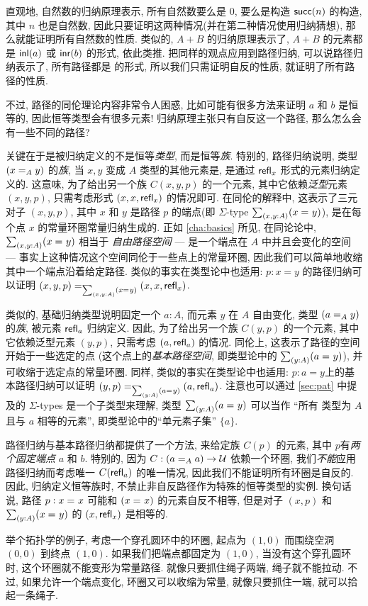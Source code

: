 \begin{rmk}\label{rmk:the-only-path-is-refl}
直观地, 自然数的归纳原理表示, 所有自然数要么是 $0$, 要么是构造 $\suc(n)$ 的构造, 其中 $n$ 也是自然数,  因此只要证明这两种情况(并在第二种情况使用归纳猜想), 那么就能证明所有自然数的性质.
类似的, $A+B$ 的归纳原理表示了,  $A+B$ 的元素都是 $\inl(a)$ 或 $\inr(b)$ 的形式,  依此类推.
把同样的观点应用到路径归纳, 可以说路径归纳表示了, 所有路径都是  的形式, 所以我们只需证明自反的性质, 就证明了所有路径的性质.

不过, 路径的同伦理论内容非常令人困惑, 比如可能有很多方法来证明 $a$ 和 $b$ 是恒等的, 因此恒等类型会有很多元素!
归纳原理主张只有自反这一个路径, 那么怎么会有一些不同的路径?

关键在于是被归纳定义的不是恒等\emph{类型}, 而是恒等\emph{族}. 特别的, 路径归纳说明, 类型 $(\id[A]{x}{y})$ 的\emph{族},  当 $x,y$ 变成 $A$ 类型的其他元素是, 是通过 $\refl{x}$ 形式的元素归纳定义的. 这意味, 为了给出另一个族 $C(x,y,p)$ 的一个元素, 其中它依赖\emph{泛型}元素 $(x,y,p)$, 只需考虑形式 $(x,x,\refl{x})$ 的情况即可. 在同伦的解释中, 这表示了三元对子 $(x,y,p)$, 其中 $x$ 和 $y$ 是路径 $p$ 的端点(即 $\Sigma$-type $\sm{x,y:A}(\id{x}{y})$), 是在每个点 $x$ 的常量环圈常量归纳生成的. 正如 \cref{cha:basics} 所见, 在同论论中, $\sm{x,y:A}(\id{x}{y})$ 相当于 \emph{自由路径空间} --- 是一个端点在 $A$ 中并且会变化的空间 --- 事实上这种情况这个空间同伦于一些点上的常量环圈, 因此我们可以简单地收缩其中一个端点沿着给定路径. 类似的事实在类型论中也适用: $p:x=y$ 的路径归纳可以证明 $\id[\sm{x,y:A}(\id{x}{y})]{(x,y,p)}{(x,x,\refl{x})}$. 

类似的, 基础归纳类型说明固定一个 $a:A$, 而元素 $y$ 在 $A$ 自由变化, 类型 $(\id[A]{a}{y})$ 的\emph{族}, 被元素 $\refl{a}$ 归纳定义. 因此, 为了给出另一个族 $C(y,p)$ 的一个元素, 其中它依赖泛型元素 $(y,p)$, 只需考虑 $(a,\refl{a})$ 的情况. 同伦上, 这表示了路径的空间开始于一些选定的点 (这个点上的\emph{基本路径空间}, 即类型论中的 $\sm{y:A} (\id{a}{y})$), 并可收缩于选定点的常量环圈. 同样, 类似的事实在类型论中也适用: $p:a=y$上的基本路径归纳可以证明 $\id[\sm{y:A}(\id{a}{y})]{(y,p)}{(a,\refl{a})}$. 注意也可以通过 \cref{sec:pat} 中提及的 $\Sigma$-types 是一个子类型来理解, 类型 $\sm{y:A}(\id{a}{y})$ 可以当作 ``所有 类型为 $A$ 且与 $a$ 相等的元素'', 即类型论中的``单元素子集'' $\{a\}$. 

路径归纳与基本路径归纳都提供了一个方法, 来给定族 $C(p)$ 的元素, 其中 $p$有\emph{两个固定端点} $a$ 和 $b$. 特别的, 因为 $C: (\id[A]{a}{a}) \to \UU$ 依赖一个环圈, 我们\emph{不能}应用路径归纳而考虑唯一 $C(\refl{a})$ 的唯一情况, 因此我们不能证明所有环圈是自反的. 因此, 归纳定义恒等族时, 不禁止非自反路径作为特殊的恒等类型的实例. 换句话说, 路径 $p:\id{x}{x}$ 可能和 $(\id{x}{x})$ 的元素自反不相等, 但是对子 $(x,p)$ 和 $\sm{y:A}(\id{x}{y})$ 的 $(x,\refl{x})$ 是相等的. 

举个拓扑学的例子, 考虑一个穿孔圆环中的环圈, 起点为 $(1,0)$ 而围绕空洞 $(0,0)$ 到终点 $(1,0)$. 如果我们把端点都固定为 $(1,0)$, 当没有这个穿孔圆环时, 这个环圈就不能变形为常量路径. 就像只要抓住绳子两端, 绳子就不能拉动. 不过, 如果允许一个端点变化, 环圈又可以收缩为常量, 就像只要抓住一端, 就可以拾起一条绳子. \end{rmk}

